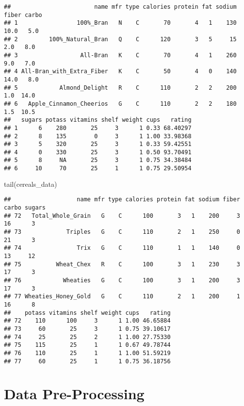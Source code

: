 \documentclass[
]{article}
\newenvironment{Shaded}{\begin{snugshade}}{\end{snugshade}}
\newcommand{\FunctionTok}[1]{\textcolor[rgb]{0.00,0.00,0.00}{#1}}
\newcommand{\NormalTok}[1]{#1}
\begin{document}
\begin{verbatim}
##                        name mfr type calories protein fat sodium fiber carbo
## 1                 100%_Bran   N    C       70       4   1    130  10.0   5.0
## 2         100%_Natural_Bran   Q    C      120       3   5     15   2.0   8.0
## 3                  All-Bran   K    C       70       4   1    260   9.0   7.0
## 4 All-Bran_with_Extra_Fiber   K    C       50       4   0    140  14.0   8.0
## 5            Almond_Delight   R    C      110       2   2    200   1.0  14.0
## 6   Apple_Cinnamon_Cheerios   G    C      110       2   2    180   1.5  10.5
##   sugars potass vitamins shelf weight cups   rating
## 1      6    280       25     3      1 0.33 68.40297
## 2      8    135        0     3      1 1.00 33.98368
## 3      5    320       25     3      1 0.33 59.42551
## 4      0    330       25     3      1 0.50 93.70491
## 5      8     NA       25     3      1 0.75 34.38484
## 6     10     70       25     1      1 0.75 29.50954
\end{verbatim}

\begin{Shaded}
\begin{Highlighting}[]
\FunctionTok{tail}\NormalTok{(cereals\_data)}
\end{Highlighting}
\end{Shaded}

\begin{verbatim}
##                   name mfr type calories protein fat sodium fiber carbo sugars
## 72   Total_Whole_Grain   G    C      100       3   1    200     3    16      3
## 73             Triples   G    C      110       2   1    250     0    21      3
## 74                Trix   G    C      110       1   1    140     0    13     12
## 75          Wheat_Chex   R    C      100       3   1    230     3    17      3
## 76            Wheaties   G    C      100       3   1    200     3    17      3
## 77 Wheaties_Honey_Gold   G    C      110       2   1    200     1    16      8
##    potass vitamins shelf weight cups   rating
## 72    110      100     3      1 1.00 46.65884
## 73     60       25     3      1 0.75 39.10617
## 74     25       25     2      1 1.00 27.75330
## 75    115       25     1      1 0.67 49.78744
## 76    110       25     1      1 1.00 51.59219
## 77     60       25     1      1 0.75 36.18756
\end{verbatim}

\hypertarget{data-pre-processing}{%
\section{Data Pre-Processing}\label{data-pre-processing}}
\end{document}
